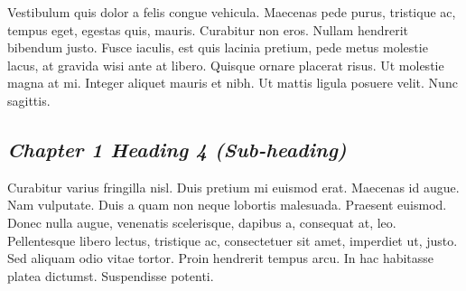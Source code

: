Vestibulum quis dolor a felis congue vehicula. Maecenas pede purus, tristique ac, tempus eget, egestas quis, mauris. Curabitur non eros. Nullam hendrerit bibendum justo. Fusce iaculis, est quis lacinia pretium, pede metus molestie lacus, at gravida wisi ante at libero. Quisque ornare placerat risus. Ut molestie magna at mi. Integer aliquet mauris et nibh. Ut mattis ligula posuere velit. Nunc sagittis.\par

\subsection{\emph{Chapter 1 Heading 4 (Sub-heading)}}

Curabitur varius fringilla nisl. Duis pretium mi euismod erat. Maecenas id augue. Nam vulputate. Duis a quam non neque lobortis malesuada. Praesent euismod. Donec nulla augue, venenatis scelerisque, dapibus a, consequat at, leo. Pellentesque libero lectus, tristique ac, consectetuer sit amet, imperdiet ut, justo. Sed aliquam odio vitae tortor. Proin hendrerit tempus arcu. In hac habitasse platea dictumst. Suspendisse potenti.\par
